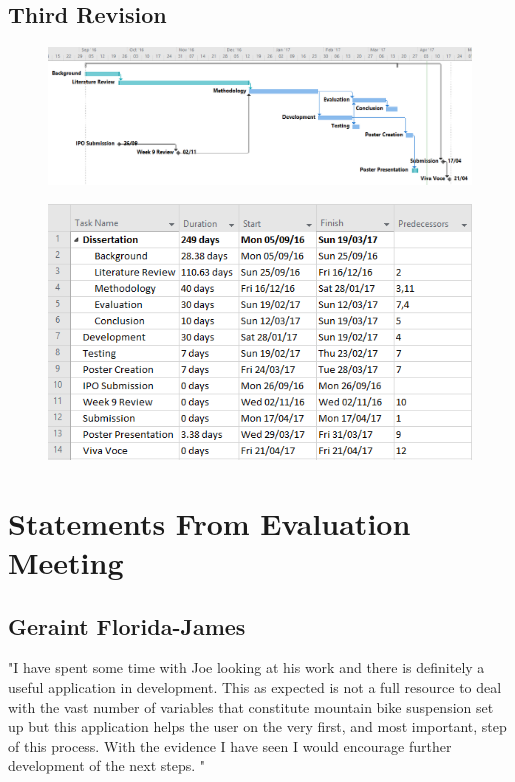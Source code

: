 	\subsection{Third Revision}
		\begin{figure}[h!]
			\includegraphics[width=\textwidth]{../images/gantt/v3/gantt.PNG}
		\end{figure}
		\begin{figure}[h!]
			\includegraphics[]{../images/gantt/v3/tasks.PNG}
		\end{figure}
\clearpage
\section{Statements From Evaluation Meeting}\label{app:eval_statements}
\subsection{Geraint Florida-James}
"I have spent some time with Joe looking at his work and there is definitely a useful application in development. This as expected is not a full resource to deal with the vast number of variables that constitute mountain bike suspension set up but this application helps the user on the very first, and most important, step of this process. With the evidence I have seen I would encourage further development of the next steps. "
\clearpage
